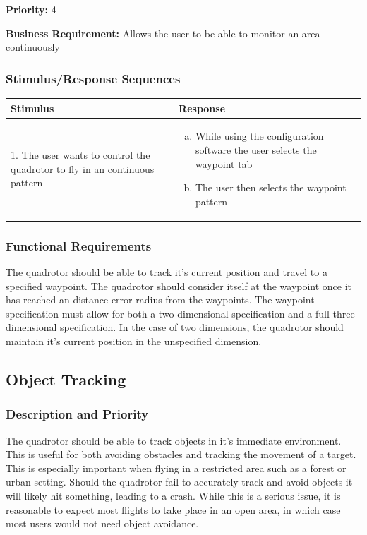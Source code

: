 \documentclass[english]{article}
\numberwithin{equation}{section} %
\begin{document}
\textbf{Priority:} 4

\textbf{Business Requirement:} Allows the user to be able to monitor an area continuously

\subsubsection{Stimulus/Response Sequences}

\begin{longtable}{p{3cm} | p{8.5cm}}
\hline
\textbf{Stimulus} & \textbf{Response}\\
\hline
1. The user wants to control the quadrotor to fly in an continuous pattern &
\begin{enumerate}[(a)]\itemsep1pt %
\item While using the configuration software the user selects the waypoint tab
\item The user then selects the waypoint pattern
\end{enumerate}
\\ 
\hline
\end{longtable}
\subsubsection{Functional Requirements}
The quadrotor should be able to track it's current position and travel to a specified waypoint. The quadrotor should consider itself at the waypoint once it has reached an distance error radius from the waypoints. The waypoint specification must allow for both a two dimensional specification and a full three dimensional specification. In the case of two dimensions, the quadrotor should maintain it's current position in the unspecified dimension.

\bigskip
\subsection{Object Tracking}
\subsubsection{Description and Priority}
The quadrotor should be able to track objects in it's immediate environment. This is useful for both avoiding obstacles and tracking the movement of a target. This is especially important when flying in a restricted area such as a forest or urban setting. Should the quadrotor fail to accurately track and avoid objects it will likely hit something, leading to a crash. While this is a serious issue, it is reasonable to expect most flights to take place in an open area, in which case most users would not need object avoidance.
\end{document}
